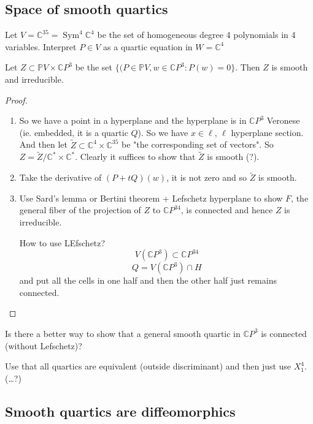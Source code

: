 \subsection{Space of smooth quartics}

Let $V=\mathbb{C}^{35}=\operatorname{Sym}^4\mathbb{C}^4$ be the set of homogeneous degree 4 polynomials in 4 variables. Interpret $P\in V$ as a quartic equation in $W=\mathbb{C}^{4}$

\begin{claim}
	Let $Z\subset \mathbb{P}V\times \mathbb{C}P^{3}$ be the set $\{(P\in\mathbb{P}V,w\in\mathbb{C}P^{3}:P(w)=0\}$. Then $Z$ is smooth and irreducible.
\end{claim}

\begin{proof}
	\begin{enumerate}[label=\textbf{Step \arabic*}]
		\item So we have a point in a hyperplane and the hyperplane is in $\mathbb{C}P^{3}$ Veronese (ie. embedded, it is a quartic $Q$). So we have $x\in\ell$, $\ell$ hyperplane section. And then let $\tilde{Z}\subset \mathbb{C}^4\times \mathbb{C}^{35}$ be "the corresponding set of vectors". So $Z=\tilde{Z}/\mathbb{C}^*\times \mathbb{C}^*$. Clearly it suffices to show that $\tilde{Z}$ is smooth (?).

		\item Take the derivative of $(P+tQ)(w)$, it is not zero and so  $\tilde{Z}$ is smooth.

		\item Use Sard's lemma or Bertini theorem + Lefschetz hyperplane to show $F$, the general fiber of the projection of  $Z$ to  $\mathbb{C}P^{34}$, is connected and hence $Z$ is irreducible.

			How to use LEfschetz?
\[V(\mathbb{C}P^{3})\subset \mathbb{C}P^{34}\]
\[Q=V(\mathbb{C}P^{3})\cap H\]
and put all the cells in one half and then the other half just remains connected.
	\end{enumerate}
\end{proof}

\begin{question}
	Is there a better way to show that a general smooth quartic in $\mathbb{C}P^{3}$ is connected (without Lefschetz)?

	Use that all quartics are equivalent (outside discriminant) and then just use $X_1^4$. (…?)
\end{question}

\subsection{ Smooth quartics are diffeomorphics}

